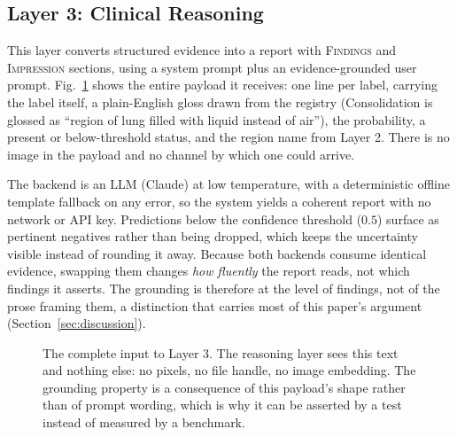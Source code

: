 \documentclass[10pt,twocolumn]{article}
\begin{document}
\subsection{Layer 3: Clinical Reasoning}
This layer converts structured evidence into a report with \textsc{Findings} and
\textsc{Impression} sections, using a system prompt plus an evidence-grounded user
prompt. Fig.~\ref{fig:evidence} shows the entire payload it receives: one line per
label, carrying the label itself, a plain-English gloss drawn from the registry
(Consolidation is glossed as ``region of lung filled with liquid instead of
air''), the probability, a present or below-threshold status, and the region name
from Layer 2. There is no image in the payload and no channel by which one could
arrive.

The backend is an LLM (Claude) at low temperature, with a deterministic offline
template fallback on any error, so the system yields a coherent report with no
network or API key. Predictions below the confidence threshold ($0.5$) surface as
pertinent negatives rather than being dropped, which keeps the uncertainty visible
instead of rounding it away. Because both backends consume identical evidence,
swapping them changes \emph{how fluently} the report reads, not which findings it
asserts. The grounding is therefore at the level of findings, not of the prose
framing them, a distinction that carries most of this paper's argument
(Section~\ref{sec:discussion}).

\begin{figure}[tbp]
\centering
{}
\caption{The complete input to Layer 3. The reasoning layer sees this text and
nothing else: no pixels, no file handle, no image embedding. The grounding
property is a consequence of this payload's shape rather than of prompt wording,
which is why it can be asserted by a test instead of measured by a benchmark.}
\label{fig:evidence}
\end{figure}
\end{document}
